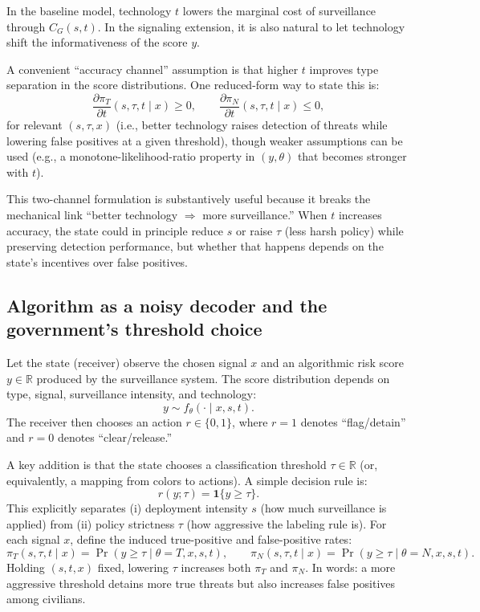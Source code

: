 \documentclass[11pt,a4paper]{article}
\theoremstyle{definition}
\theoremstyle{remark}
\theoremstyle{definition}
\begin{document}
In the baseline model, technology $t$ lowers the marginal cost of surveillance through $C_G(s,t)$. In the signaling extension, it is also natural to let
technology shift the informativeness of the score $y$.

A convenient ``accuracy channel'' assumption is that higher $t$ improves type separation in the score distributions. One reduced-form way to state this is:
$$
\frac{\partial \pi_T}{\partial t}(s,\tau,t \mid x) \ge 0,
\qquad
\frac{\partial \pi_N}{\partial t}(s,\tau,t \mid x) \le 0,
$$
for relevant $(s,\tau,x)$ (i.e., better technology raises detection of threats while lowering false positives at a given threshold), though weaker
assumptions can be used (e.g., a monotone-likelihood-ratio property in $(y,\theta)$ that becomes stronger with $t$).

This two-channel formulation is substantively useful because it breaks the mechanical link ``better technology $\Rightarrow$ more surveillance.''
When $t$ increases accuracy, the state could in principle reduce $s$ or raise $\tau$ (less harsh policy) while preserving detection performance,
but whether that happens depends on the state's incentives over false positives.

\subsection{Algorithm as a noisy decoder and the government's threshold choice}

Let the state (receiver) observe the chosen signal $x$ and an algorithmic risk score $y \in \mathbb{R}$ produced by the surveillance system.
The score distribution depends on type, signal, surveillance intensity, and technology:
$$
y \sim f_\theta(\cdot \mid x, s, t).
$$
The receiver then chooses an action $r \in \{0,1\}$, where $r=1$ denotes ``flag/detain'' and $r=0$ denotes ``clear/release.''

A key addition is that the state chooses a classification threshold $\tau \in \mathbb{R}$ (or, equivalently, a mapping from colors to actions).
A simple decision rule is:
$$
r(y;\tau)=\mathbf{1}\{y \ge \tau\}.
$$
This explicitly separates (i) deployment intensity $s$ (how much surveillance is applied) from (ii) policy strictness $\tau$
(how aggressive the labeling rule is). For each signal $x$, define the induced true-positive and false-positive rates:
$$
\pi_T(s,\tau,t \mid x)=\Pr(y \ge \tau \mid \theta=T, x, s, t),
\qquad
\pi_N(s,\tau,t \mid x)=\Pr(y \ge \tau \mid \theta=N, x, s, t).
$$
Holding $(s,t,x)$ fixed, lowering $\tau$ increases both $\pi_T$ and $\pi_N$. In words: a more aggressive threshold detains more true threats
but also increases false positives among civilians.
\end{document}
